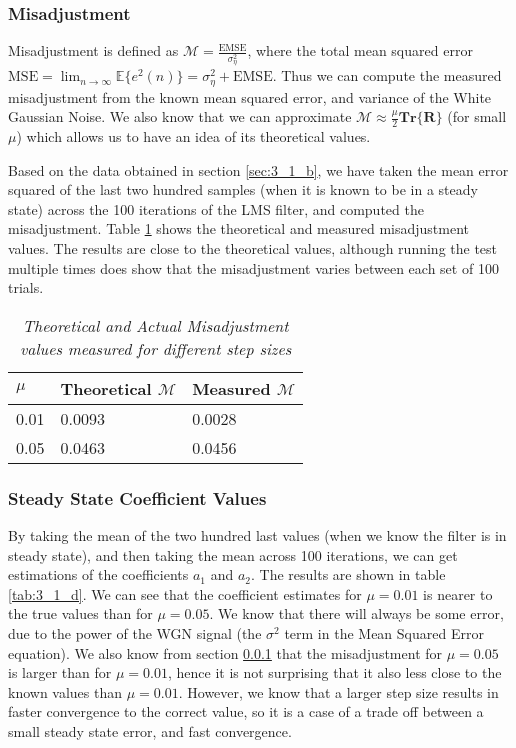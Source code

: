 \documentclass[./main.tex]{subfiles}
\begin{document}
\subsubsection{Misadjustment} \label{sec:3_1_c}

Misadjustment is defined as $ \mathcal{M} = \frac{\mathrm{EMSE}}{\sigma^2_\eta}$, where the total mean squared error $ \mathrm{MSE} = \lim_{n \to \infty} \mathbb{E} \{ e^2 (n) \} = \sigma^2_\eta + \mathrm{EMSE} $. Thus we can compute the measured misadjustment from the known mean squared error, and variance of the White Gaussian Noise. We also know that we can approximate $  \mathcal{M} \approx \frac{\mu}{2} \mathbf{Tr} \{ \mathbf{R} \}$ (for small $\mu$) which allows us to have an idea of its theoretical values.

Based on the data obtained in section \ref{sec:3_1_b}, we have taken the mean error squared of the last two hundred samples (when it is known to be in a steady state) across the 100 iterations of the LMS filter, and computed the misadjustment. Table \ref{tab:3_1_c} shows the theoretical and measured misadjustment values. The results are close to the theoretical values, although running the test multiple times does show that the misadjustment varies between each set of 100 trials.

\begin{table}[h]
\centering
\begin{tabular}{|l|l|l|}
\hline	
$\mu$  & Theoretical $\mathcal{M}$ & Measured $\mathcal{M}$ \\ \hline
0.01 & 0.0093                    & 0.0028                 \\ \hline
0.05 & 0.0463                    & 0.0456                 \\ \hline
\end{tabular}
\caption{\textit{Theoretical and Actual Misadjustment values measured for different step sizes}}
\label{tab:3_1_c}
\end{table}

\subsubsection{Steady State Coefficient Values}
By taking the mean of the two hundred last values (when we know the filter is in steady state), and then taking the mean across 100 iterations, we can get estimations of the coefficients $a_1$ and $a_2$. The results are shown in table \ref{tab:3_1_d}. We can see that the coefficient estimates for $\mu = 0.01$ is nearer to the true values than for $\mu = 0.05$. We know that there will always be some error, due to the power of the WGN signal (the $ \sigma^2$ term in the Mean Squared Error equation). We also know from section \ref{sec:3_1_c} that the misadjustment for  $\mu = 0.05$ is larger than for $\mu = 0.01 $, hence it is not surprising that it also less close to the known values than  $\mu = 0.01$. However, we know that a larger step size results in faster convergence to the correct value, so it is a case of a trade off between a small steady state error, and fast convergence.
\end{document}
